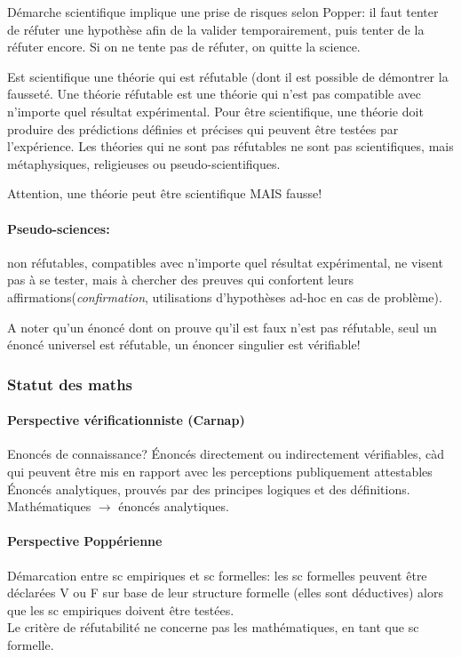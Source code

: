 \documentclass{report}
\begin{document}
	Démarche scientifique implique une prise de risques selon Popper: il faut tenter de réfuter une hypothèse afin de la valider temporairement, puis tenter de la réfuter encore. Si on ne tente pas de réfuter, on quitte la science.
	
	Est scientifique une théorie qui est réfutable (dont il est possible de démontrer la fausseté. Une théorie réfutable est une théorie qui n’est pas compatible avec n’importe quel résultat expérimental. Pour être scientifique, une théorie doit produire des prédictions définies et précises qui peuvent être testées par l’expérience. Les théories qui ne sont pas réfutables ne sont pas scientifiques, mais métaphysiques, religieuses ou pseudo-scientifiques.
	
	Attention, une théorie peut être scientifique MAIS fausse!
	
	\paragraph{Pseudo-sciences:} non réfutables, compatibles avec n’importe quel résultat expérimental, ne visent pas à se tester, mais à chercher des preuves qui confortent leurs affirmations(\emph{confirmation}, utilisations d'hypothèses ad-hoc en cas de problème).
	
	A noter qu'un énoncé dont on prouve qu'il est faux n'est pas réfutable, seul un énoncé universel est réfutable, un énoncer singulier est vérifiable!
	
	\subsubsection{Statut des maths}
	
	\paragraph{Perspective vérificationniste (Carnap)}
	Enoncés de connaissance? Énoncés directement ou indirectement vérifiables, càd qui peuvent être mis en rapport avec les perceptions publiquement attestables\\
	Énoncés analytiques, prouvés par des principes logiques et des définitions.\\
	Mathématiques $\rightarrow$ énoncés analytiques.
	
	\paragraph{Perspective Poppérienne}
	Démarcation entre sc empiriques et sc formelles: les sc formelles peuvent être déclarées V ou F sur base de leur structure formelle (elles sont déductives) alors que les sc empiriques doivent être testées.\\
	Le critère de réfutabilité ne concerne pas les mathématiques, en tant que sc formelle.
	
\end{document}
